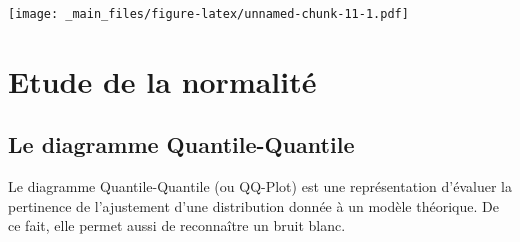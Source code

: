 \documentclass[
]{book}
\newenvironment{Shaded}{\begin{snugshade}}{\end{snugshade}}
\newcommand{\AttributeTok}[1]{\textcolor[rgb]{0.13,0.29,0.53}{#1}}
\newcommand{\DecValTok}[1]{\textcolor[rgb]{0.00,0.00,0.81}{#1}}
\newcommand{\FloatTok}[1]{\textcolor[rgb]{0.00,0.00,0.81}{#1}}
\newcommand{\FunctionTok}[1]{\textcolor[rgb]{0.13,0.29,0.53}{\textbf{#1}}}
\newcommand{\NormalTok}[1]{#1}
\newcommand{\OtherTok}[1]{\textcolor[rgb]{0.56,0.35,0.01}{#1}}
\newcommand{\SpecialCharTok}[1]{\textcolor[rgb]{0.81,0.36,0.00}{\textbf{#1}}}
\newcommand{\StringTok}[1]{\textcolor[rgb]{0.31,0.60,0.02}{#1}}
\theoremstyle{definition}
\theoremstyle{definition}
\theoremstyle{definition}
\theoremstyle{definition}
\theoremstyle{remark}
\begin{document}
\begin{Shaded}
\end{Shaded}

\texttt{[image: \_main\_files/figure-latex/unnamed-chunk-11-1.pdf]}

\hypertarget{etude-de-la-normalituxe9}{%
\section{Etude de la normalité}\label{etude-de-la-normalituxe9}}

\hypertarget{le-diagramme-quantile-quantile}{%
\subsection{Le diagramme Quantile-Quantile}\label{le-diagramme-quantile-quantile}}

Le diagramme Quantile-Quantile (ou QQ-Plot) est une représentation d'évaluer la pertinence de l'ajustement d'une distribution donnée à un modèle théorique. De ce fait, elle permet aussi de reconnaître un bruit blanc.
\end{document}
